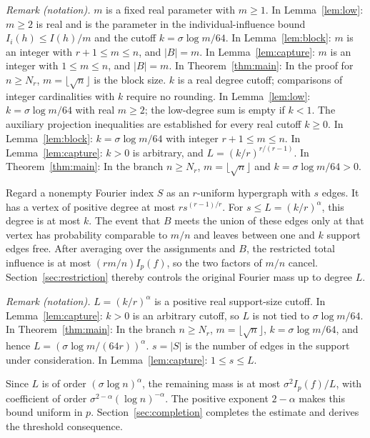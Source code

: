 \noindent\textit{Remark (notation).} $m$ is a fixed real parameter with $m\ge1$. In Lemma~\ref{lem:low}: $m\ge2$ is real and is the parameter in the individual-influence bound $I_i(h)\le I(h)/m$ and the cutoff $k=\sigma\log m/64$. In Lemma~\ref{lem:block}: $m$ is an integer with $r+1\le m\le n$, and $|B|=m$. In Lemma~\ref{lem:capture}: $m$ is an integer with $1\le m\le n$, and $|B|=m$. In Theorem~\ref{thm:main}: In the proof for $n\ge N_r$, $m=\lfloor\sqrt n\rfloor$ is the block size. $k$ is a real degree cutoff; comparisons of integer cardinalities with $k$ require no rounding. In Lemma~\ref{lem:low}: $k=\sigma\log m/64$ with real $m\ge2$; the low-degree sum is empty if $k<1$. The auxiliary projection inequalities are established for every real cutoff $k\ge0$. In Lemma~\ref{lem:block}: $k=\sigma\log m/64$ with integer $r+1\le m\le n$. In Lemma~\ref{lem:capture}: $k>0$ is arbitrary, and $L=(k/r)^{r/(r-1)}$. In Theorem~\ref{thm:main}: In the branch $n\ge N_r$, $m=\lfloor\sqrt n\rfloor$ and $k=\sigma\log m/64>0$.


Regard a nonempty Fourier index $S$ as an $r$-uniform hypergraph
with $s$ edges. It has a vertex of positive degree at most
$r s^{(r-1)/r}$. For $s\le L=(k/r)^\alpha$, this degree is at
most $k$. The event that $B$ meets the union of these edges only
at that vertex has probability comparable to $m/n$ and leaves
between one and $k$ support edges free. After averaging over the
assignments and $B$, the restricted total influence is at most
$(rm/n)I_p(f)$, so the two factors of $m/n$ cancel.
Section~\ref{sec:restriction} thereby controls the original
Fourier mass up to degree $L$.

\noindent\textit{Remark (notation).} $L=(k/r)^\alpha$ is a positive real support-size cutoff. In Lemma~\ref{lem:capture}: $k>0$ is an arbitrary cutoff, so $L$ is not tied to $\sigma\log m/64$. In Theorem~\ref{thm:main}: In the branch $n\ge N_r$, $m=\lfloor\sqrt n\rfloor$, $k=\sigma\log m/64$, and hence $L=(\sigma\log m/(64r))^\alpha$. $s=|S|$ is the number of edges in the support under consideration. In Lemma~\ref{lem:capture}: $1\le s\le L$.


Since $L$ is of order $(\sigma\log n)^\alpha$, the remaining
mass is at most $\sigma^2I_p(f)/L$, with coefficient of order
$\sigma^{2-\alpha}(\log n)^{-\alpha}$. The positive exponent
$2-\alpha$ makes this bound uniform in $p$.
Section~\ref{sec:completion} completes the estimate and derives
the threshold consequence.
